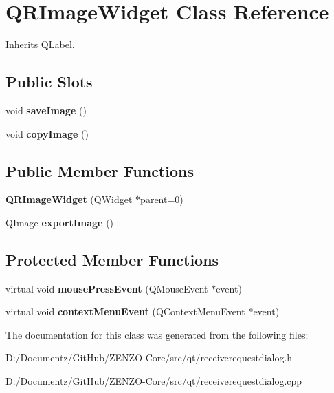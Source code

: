 \hypertarget{class_q_r_image_widget}{}\section{Q\+R\+Image\+Widget Class Reference}
\label{class_q_r_image_widget}


Inherits Q\+Label.

\subsection*{Public Slots}
\begin{DoxyCompactItemize}
\item 
\mbox{\label{class_q_r_image_widget_a957f368bcd679206f0376931d4a58182}} 
void {\bfseries save\+Image} ()
\item 
\mbox{\label{class_q_r_image_widget_a3f10674c50e33d9feb360f5594610d57}} 
void {\bfseries copy\+Image} ()
\end{DoxyCompactItemize}
\subsection*{Public Member Functions}
\begin{DoxyCompactItemize}
\item 
\mbox{\label{class_q_r_image_widget_a6e4e5dbe06f17431e053d484e1f54ba9}} 
{\bfseries Q\+R\+Image\+Widget} (Q\+Widget $\ast$parent=0)
\item 
\mbox{\label{class_q_r_image_widget_a717edd656c51439324a2d73e1ac694ad}} 
Q\+Image {\bfseries export\+Image} ()
\end{DoxyCompactItemize}
\subsection*{Protected Member Functions}
\begin{DoxyCompactItemize}
\item 
\mbox{\label{class_q_r_image_widget_a41a9934596093eab1fa6c1d67cab52a7}} 
virtual void {\bfseries mouse\+Press\+Event} (Q\+Mouse\+Event $\ast$event)
\item 
\mbox{\label{class_q_r_image_widget_a82c9b3196dcc5170466078948edbcde3}} 
virtual void {\bfseries context\+Menu\+Event} (Q\+Context\+Menu\+Event $\ast$event)
\end{DoxyCompactItemize}


The documentation for this class was generated from the following files\+:\begin{DoxyCompactItemize}
\item 
D\+:/\+Documentz/\+Git\+Hub/\+Z\+E\+N\+Z\+O-\/\+Core/src/qt/receiverequestdialog.\+h\item 
D\+:/\+Documentz/\+Git\+Hub/\+Z\+E\+N\+Z\+O-\/\+Core/src/qt/receiverequestdialog.\+cpp\end{DoxyCompactItemize}
